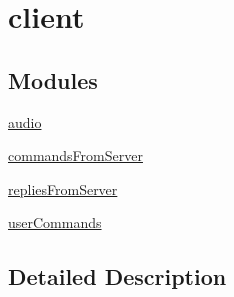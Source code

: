 \hypertarget{group___i_r_c_client}{\section{client}
\label{group___i_r_c_client}
}
\subsection*{Modules}
\begin{DoxyCompactItemize}
\item 
\hyperlink{group___i_r_c_audio}{audio}
\item 
\hyperlink{group___i_r_c_commands_from_server}{commands\-From\-Server}
\item 
\hyperlink{group___i_r_creplies_from_server}{replies\-From\-Server}
\item 
\hyperlink{group___i_r_c_user_commands}{user\-Commands}
\end{DoxyCompactItemize}


\subsection{Detailed Description}
